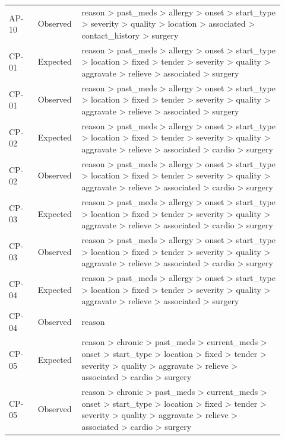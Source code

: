 \begin{longtable}{>{\raggedright\arraybackslash}p{0.1\linewidth}>{\raggedright\arraybackslash}p{0.12\linewidth}>{\raggedright\arraybackslash}p{0.7\linewidth}}
AP-\allowbreak{}10 & Observed & reason > past\_\allowbreak{}meds > allergy > onset > start\_\allowbreak{}type > severity > quality > location > associated > contact\_\allowbreak{}history > surgery \\
CP-\allowbreak{}01 & Expected & reason > past\_\allowbreak{}meds > allergy > onset > start\_\allowbreak{}type > location > fixed > tender > severity > quality > aggravate > relieve > associated > surgery \\
CP-\allowbreak{}01 & Observed & reason > past\_\allowbreak{}meds > allergy > onset > start\_\allowbreak{}type > location > fixed > tender > severity > quality > aggravate > relieve > associated > surgery \\
CP-\allowbreak{}02 & Expected & reason > past\_\allowbreak{}meds > allergy > onset > start\_\allowbreak{}type > location > fixed > tender > severity > quality > aggravate > relieve > associated > cardio > surgery \\
CP-\allowbreak{}02 & Observed & reason > past\_\allowbreak{}meds > allergy > onset > start\_\allowbreak{}type > location > fixed > tender > severity > quality > aggravate > relieve > associated > cardio > surgery \\
CP-\allowbreak{}03 & Expected & reason > past\_\allowbreak{}meds > allergy > onset > start\_\allowbreak{}type > location > fixed > tender > severity > quality > aggravate > relieve > associated > cardio > surgery \\
CP-\allowbreak{}03 & Observed & reason > past\_\allowbreak{}meds > allergy > onset > start\_\allowbreak{}type > location > fixed > tender > severity > quality > aggravate > relieve > associated > cardio > surgery \\
CP-\allowbreak{}04 & Expected & reason > past\_\allowbreak{}meds > allergy > onset > start\_\allowbreak{}type > location > fixed > tender > severity > quality > aggravate > relieve > associated > surgery \\
CP-\allowbreak{}04 & Observed & reason \\
CP-\allowbreak{}05 & Expected & reason > chronic > past\_\allowbreak{}meds > current\_\allowbreak{}meds > onset > start\_\allowbreak{}type > location > fixed > tender > severity > quality > aggravate > relieve > associated > cardio > surgery \\
CP-\allowbreak{}05 & Observed & reason > chronic > past\_\allowbreak{}meds > current\_\allowbreak{}meds > onset > start\_\allowbreak{}type > location > fixed > tender > severity > quality > aggravate > relieve > associated > cardio > surgery \\

\end{longtable}
